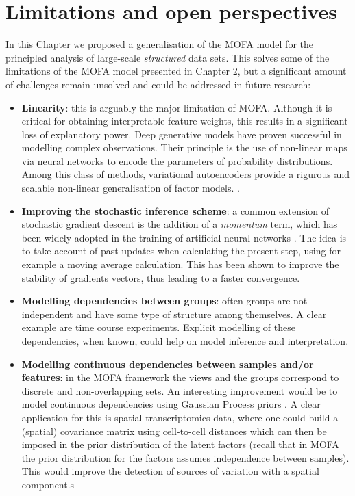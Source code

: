 \section{Limitations and open perspectives}

In this Chapter we proposed a generalisation of the MOFA model for the principled analysis of large-scale \textit{structured} data sets. This solves some of the limitations of the MOFA model presented in Chapter 2, but a significant amount of challenges remain unsolved and could be addressed in future research:

\begin{itemize}
	\item \textbf{Linearity}: this is arguably the major limitation of MOFA. Although it is critical for obtaining interpretable feature weights, this results in a significant loss of explanatory power. Deep generative models have proven successful in modelling complex observations. Their principle is the use of non-linear maps via neural networks to encode the parameters of probability distributions. Among this class of methods, variational autoencoders provide a rigurous and scalable non-linear generalisation of factor models. \cite{Ainsworth2018}.

	\item \textbf{Improving the stochastic inference scheme}: a common extension of stochastic gradient descent is the addition of a \textit{momentum} term, which has been widely adopted in the training of artificial neural networks \cite{Zeiler2012,Ning1999}. The idea is to take account of past updates when calculating the present step, using for example a moving average calculation. This has been shown to improve the stability of gradients vectors, thus leading to a faster convergence.

	\item \textbf{Modelling dependencies between groups}: often groups are not independent and have some type of structure among themselves. A clear example are time course experiments. Explicit modelling of these dependencies, when known, could help on model inference and interpretation.

	\item \textbf{Modelling continuous dependencies between samples and/or features}: in the MOFA framework the views and the groups correspond to discrete and non-overlapping sets. An interesting improvement would be to model continuous dependencies using Gaussian Process priors \cite{XX}. A clear application for this is  spatial transcriptomics data, where one could build a (spatial) covariance matrix using cell-to-cell distances which can then be imposed in the prior distribution of the latent factors (recall that in MOFA the prior distribution for the factors assumes independence between samples). This would improve the detection of sources of variation with a spatial component.s

\end{itemize}